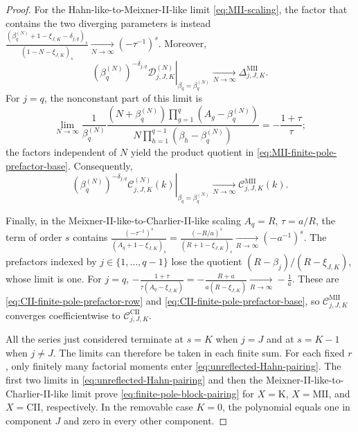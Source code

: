 \documentclass[10pt,a4paper]{amsart}
\begin{document}
\begin{proof}
For the Hahn-like-to-Meixner-II-like limit \eqref{eq:MII-scaling}, the factor that
contains the two diverging parameters is instead
\(\frac{(\beta_q^{(N)}+1-\xi_{J,K}-\delta_{j,q})_s}
{(1-N-\xi_{J,K})_s}
\xrightarrow[N\to\infty]{}(-\tau^{-1})^s\).
Moreover,
\[
 \left.
 (\beta_q^{(N)})^{-\delta_{j,q}}
 \mathcal D_{j,J,K}^{(N)}
 \right|_{\beta_q=\beta_q^{(N)}}
 \xrightarrow[N\to\infty]{}\Delta_{j,J,K}^{\mathrm{MII}}.
\]
For \(j=q\), the nonconstant part of this limit is
\[
 \lim_{N\to\infty}
 \frac1{\beta_q^{(N)}}
 \frac{(N+\beta_q^{(N)})
       \prod_{g=1}^{q}(A_g-\beta_q^{(N)})}
      {N\prod_{h=1}^{q-1}(\beta_h-\beta_q^{(N)})}
 =-\frac{1+\tau}{\tau};
\]
the factors independent of \(N\) yield the product quotient in
\eqref{eq:MII-finite-pole-prefactor-base}.  Consequently,
\[
 \left.
 (\beta_q^{(N)})^{-\delta_{j,q}}
 \mathcal C_{j,J,K}^{(N)}(k)
 \right|_{\beta_q=\beta_q^{(N)}}
 \xrightarrow[N\to\infty]{}\mathcal C_{j,J,K}^{\mathrm{MII}}(k).
\]

Finally, in the Meixner-II-like-to-Charlier-II-like scaling
\(A_q=R\), \(\tau=a/R\), the term of order \(s\) contains
\(\frac{(-\tau^{-1})^s}{(A_q+1-\xi_{J,K})_s}
=\frac{(-R/a)^s}{(R+1-\xi_{J,K})_s}
\xrightarrow[R\to\infty]{}(-a^{-1})^s\).
The prefactors indexed by \(j\in\{1,\ldots,q-1\}\) lose the quotient
\((R-\beta_j)/(R-\xi_{J,K})\), whose limit is one. For \(j=q\),
\(-\frac{1+\tau}{\tau(A_q-\xi_{J,K})}
=-\frac{R+a}{a(R-\xi_{J,K})}
\xrightarrow[R\to\infty]{}-\frac1a\).
These are \eqref{eq:CII-finite-pole-prefactor-row} and
\eqref{eq:CII-finite-pole-prefactor-base}, so
\(\mathcal C_{j,J,K}^{\mathrm{MII}}\) converges coefficientwise to
\(\mathcal C_{j,J,K}^{\mathrm{CII}}\).

All the series just considered terminate at \(s=K\) when \(j=J\) and
at \(s=K-1\) when \(j\ne J\).  The limits can therefore be taken in
each finite sum.  For each fixed \(r\), only finitely many factorial
moments enter \eqref{eq:unreflected-Hahn-pairing}. The first two limits
in \eqref{eq:unreflected-Hahn-pairing} and then the
Meixner-II-like-to-Charlier-II-like limit prove
\eqref{eq:finite-pole-block-pairing} for \(X=\mathrm K\),
\(X=\mathrm{MII}\), and \(X=\mathrm{CII}\), respectively. In the
removable case \(K=0\), the polynomial equals one in component \(J\) and
zero in every other component.


\end{proof}
\end{document}
